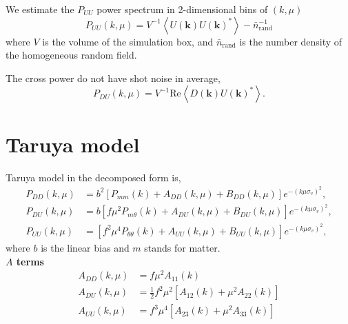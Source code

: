 \documentclass[a4paper,11pt, fleqn]{article}
\begin{document}
We estimate the $P_{UU}$ power spectrum in 2-dimensional bins of $(k, \mu)$
%
\begin{equation}
  P_{UU}(k, \mu) = V^{-1} \left\langle U(\bm{k}) U(\bm{k})^* \right\rangle
                  - \bar{n}^{-1}_\mathrm{rand}
\end{equation}
%
where $V$ is the volume of the simulation box, and
$\bar{n}_\mathrm{rand}$ is the number density of the homogeneous
random field.

The cross power do not have shot noise in average,
\begin{equation}
  P_{DU}(k, \mu) = V^{-1} \mathrm{Re}
                  \left\langle D(\bm{k}) U(\bm{k})^* \right\rangle.
\end{equation}






%
%
\newpage
\section{Taruya model}

\vspace{5mm}

Taruya model in the decomposed form is,\vspace{-2mm}
\begin{align}
  P_{DD}(k, \mu) &= b^2 \left[
    P_{mm}(k) + A_{DD}(k, \mu) + B_{DD}(k, \mu)
    \right] e^{- (k\mu\sigma_v)^2},\\
  P_{DU}(k, \mu) &= b \left[
    f\mu^2 P_{m\theta}(k) + A_{DU}(k, \mu) + B_{DU}(k, \mu)
    \right] e^{- (k\mu\sigma_v)^2},\\
  P_{UU}(k, \mu) &= \left[
    f^2 \mu^4 P_{\theta\theta}(k) + A_{UU}(k, \mu) + B_{UU}(k, \mu)
    \right] e^{- (k\mu\sigma_v)^2},   
\end{align}
where $b$ is the linear bias and $m$ stands for matter.\\


\textbf{$A$ terms}\vspace{-2mm}
\begin{align}
  A_{DD}(k, \mu) &= f\mu^2 A_{11}(k)\\
  A_{DU}(k, \mu) &= \frac{1}{2} f^2 \mu^2 \left[
                   A_{12}(k) + \mu^2 A_{22}(k) \right]\\
  A_{UU}(k, \mu) &= f^3 \mu^4 \left[ A_{23}(k) + \mu^2 A_{33}(k) \right]
\end{align}
\end{document}
